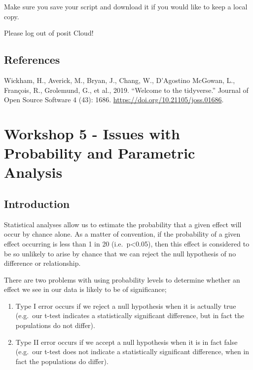 \documentclass[
]{book}
\providecommand{\tightlist}{%
  \setlength{\itemsep}{0pt}\setlength{\parskip}{0pt}}
\begin{document}
Make sure you save your script and download it if you would like to keep a local copy.

Please log out of posit Cloud!

\hypertarget{references-4}{%
\section{References}\label{references-4}}

Wickham, H., Averick, M., Bryan, J., Chang, W., D'Agostino McGowan, L., François, R., Grolemund, G., et al., 2019. ``Welcome to the tidyverse.'' Journal of Open Source Software 4 (43): 1686. \url{https://doi.org/10.21105/joss.01686}.

\hypertarget{workshop-5---issues-with-probability-and-parametric-analysis}{%
\chapter{Workshop 5 - Issues with Probability and Parametric Analysis}\label{workshop-5---issues-with-probability-and-parametric-analysis}}

\hypertarget{introduction-4}{%
\section{Introduction}\label{introduction-4}}

Statistical analyses allow us to estimate the probability that a given effect will occur by chance alone. As a matter of convention, if the probability of a given effect occurring is less than 1 in 20 (i.e.~p\textless0.05), then this effect is considered to be so unlikely to arise by chance that we can reject the null hypothesis of no difference or relationship.

There are two problems with using probability levels to determine whether an effect we see in our data is likely to be of significance;

\begin{enumerate}
\def\labelenumi{\arabic{enumi})}
\tightlist
\item
  Type I error occurs if we reject a null hypothesis when it is actually true (e.g.~our t-test indicates a statistically significant difference, but in fact the populations do not differ).
\item
  Type II error occurs if we accept a null hypothesis when it is in fact false (e.g.~our t-test does not indicate a statistically significant difference, when in fact the populations do differ).
\end{enumerate}
\end{document}
